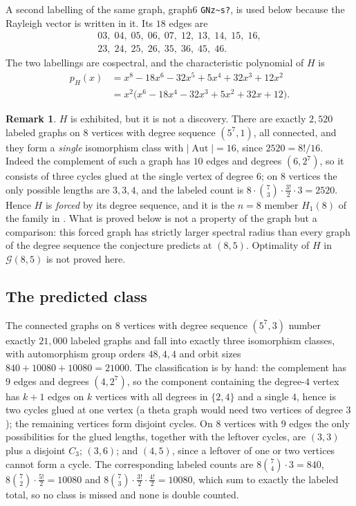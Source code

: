 \documentclass[11pt]{amsart}
\theoremstyle{definition}
\newtheorem{remark}[theorem]{Remark}
\DeclareMathOperator{\Aut}{Aut}
\begin{document}
A second labelling of the same graph, graph6 \texttt{GNz\textasciitilde{}s?}, is
used below because the Rayleigh vector is written in it. Its $18$ edges are
\[
\begin{array}{l}
03,\;04,\;05,\;06,\;07,\;12,\;13,\;14,\;15,\;16,\\
23,\;24,\;25,\;26,\;35,\;36,\;45,\;46 .
\end{array}
\]
The two labellings are cospectral, and the characteristic polynomial of $H$ is
\begin{equation}\label{eq:pH}
\begin{aligned}
p_H(x)&=x^8-18x^6-32x^5+5x^4+32x^3+12x^2\\
      &=x^2\bigl(x^6-18x^4-32x^3+5x^2+32x+12\bigr).
\end{aligned}
\end{equation}

\begin{remark}\label{rem:notafind}
$H$ is exhibited, but it is not a discovery. There are exactly $2{,}520$ labeled
graphs on $8$ vertices with degree sequence $(5^7,1)$, all connected, and they
form a \emph{single} isomorphism class with $|\Aut|=16$, since
$2520=8!/16$. Indeed the complement of such a graph has $10$ edges and degrees
$(6,2^7)$, so it consists of three cycles glued at the single vertex of degree
$6$; on $8$ vertices the only possible lengths are $3,3,4$, and the labeled
count is $8\cdot\binom{7}{3}\cdot\frac{3!}{2}\cdot 3=2520$. Hence $H$ is
\emph{forced} by its degree sequence, and it is the $n=8$ member $H_1(8)$ of the
family in \cite{HLY}. What is proved below is not a property of the graph but a
comparison: this forced graph has strictly larger spectral radius than every
graph of the degree sequence the conjecture predicts at $(8,5)$. Optimality of
$H$ in $\mathcal{G}(8,5)$ is not proved here.
\end{remark}

\subsection{The predicted class}
The connected graphs on $8$ vertices with degree sequence $(5^7,3)$ number
exactly $21{,}000$ labeled graphs and fall into exactly three isomorphism
classes, with automorphism group orders $48,4,4$ and orbit sizes
$840+10080+10080=21000$. The classification is by hand: the complement has $9$
edges and degrees $(4,2^7)$, so the component containing the degree-$4$ vertex
has $k+1$ edges on $k$ vertices with all degrees in $\{2,4\}$ and a single $4$,
hence is two cycles glued at one vertex (a theta graph would need two vertices
of degree $3$); the remaining vertices form disjoint cycles. On $8$ vertices with
$9$ edges the only possibilities for the glued lengths, together with the
leftover cycles, are $(3,3)$ plus a disjoint $C_3$; $(3,6)$; and $(4,5)$, since
a leftover of one or two vertices cannot form a cycle. The corresponding labeled
counts are $8\binom{7}{4}\cdot 3=840$, $8\binom{7}{2}\cdot\frac{5!}{2}=10080$ and
$8\binom{7}{3}\cdot\frac{3!}{2}\cdot\frac{4!}{2}=10080$, which sum to exactly the
labeled total, so no class is missed and none is double counted.
\end{document}
